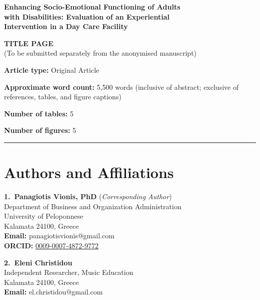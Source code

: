\documentclass[12pt,a4paper]{article}
\begin{document}
\begin{center}

{\Large\bfseries Enhancing Socio-Emotional Functioning of Adults\\[6pt]
with Disabilities: Evaluation of an Experiential\\[6pt]
Intervention in a Day Care Facility}

\vspace{1.5cm}

{\large\bfseries TITLE PAGE}\\[0.4cm]
{\small (To be submitted separately from the anonymised manuscript)}

\end{center}

\vspace{1.5cm}

\noindent\textbf{Article type:} Original Article

\noindent\textbf{Approximate word count:} 5,500 words (inclusive of abstract; exclusive of references, tables, and figure captions)

\noindent\textbf{Number of tables:} 5

\noindent\textbf{Number of figures:} 5

\vspace{1cm}

\noindent\rule{\textwidth}{0.4pt}

\section*{Authors and Affiliations}

\vspace{0.5cm}

\noindent\textbf{1.~Panagiotis Vionis, PhD} \quad (\textit{Corresponding Author})\\
Department of Business and Organization Administration\\
University of Peloponnese\\
Kalamata 24100, Greece\\
\textbf{Email:} panagiotisvionis@gmail.com\\
\textbf{ORCID:} \href{https://orcid.org/0009-0007-4872-9772}{0009-0007-4872-9772}

\vspace{0.8cm}

\noindent\textbf{2.~Eleni Christidou}\\
Independent Researcher, Music Education\\
Kalamata 24100, Greece\\
\textbf{Email:} el.christidou@gmail.com
\end{document}
